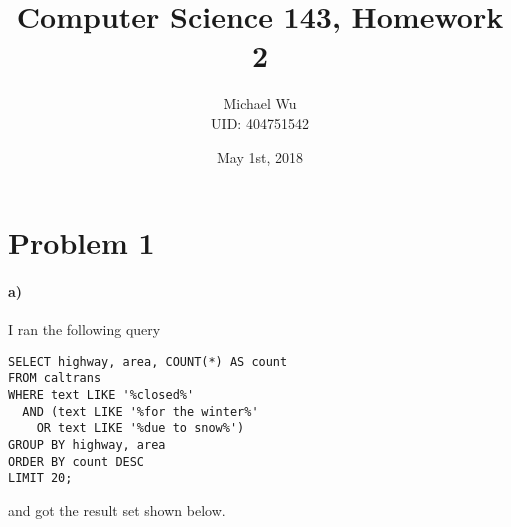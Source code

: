 \documentclass[12pt]{article}
\begin{document}
\title{Computer Science 143, Homework 2}
\date{May 1st, 2018}
\author{Michael Wu\\UID: 404751542}
\maketitle

\section*{Problem 1}

\paragraph{a)}

I ran the following query
\begin{verbatim}
SELECT highway, area, COUNT(*) AS count
FROM caltrans
WHERE text LIKE '%closed%'
  AND (text LIKE '%for the winter%'
    OR text LIKE '%due to snow%')
GROUP BY highway, area
ORDER BY count DESC
LIMIT 20;
\end{verbatim}
and got the result set shown below.
\end{document}
